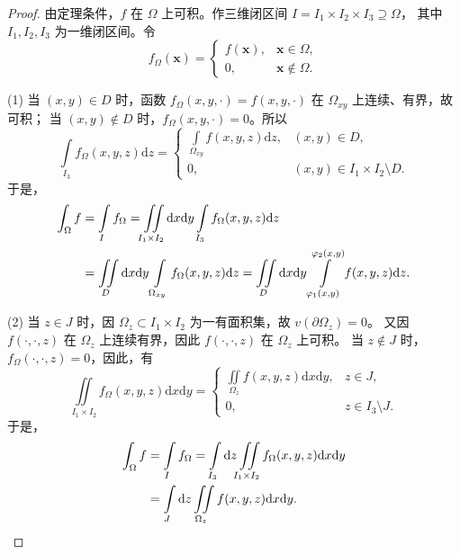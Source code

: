 \begin{proof}
由定理条件，$f$ 在 $\Omega$ 上可积。作三维闭区间 $I = I_1 \times I_2 \times I_3 \supseteq \Omega$，
其中 $I_1, I_2, I_3$ 为一维闭区间。令
\[
f_{\Omega}(\boldsymbol{x}) =
\begin{cases}
  f(\boldsymbol{x}), & \boldsymbol{x} \in \Omega,\\
  0, & \boldsymbol{x} \notin \Omega.
\end{cases}
\]

(1) 当 $(x, y) \in D$ 时，函数 $f_{\Omega}(x, y, \cdot) = f(x, y, \cdot)$ 在 $\Omega_{xy}$ 上连续、有界，故可积；
当 $(x, y) \notin D$ 时，$f_{\Omega}(x, y, \cdot) = 0$。所以
\[
\int \limits_{I_3} f_{\Omega}(x, y, z) \mathrm{d}z =
\begin{cases}
  \displaystyle\int \limits_{\Omega_{xy}} f(x, y, z) \mathrm{d}z, & (x, y) \in D,\\[6pt]
  0, & (x, y) \in I_1 \times I_2 \setminus D.
\end{cases}
\]
于是，
\begin{align*}
\int_{\Omega} f
&= \int \limits_{I} f_{\Omega}
 = \iint \limits_{I_1 \times I_2} \mathrm{d}x \mathrm{d}y \int \limits_{I_3} f_{\Omega}(x, y, z) \mathrm{d}z \notag\\
&= \iint \limits_{D} \mathrm{d}x \mathrm{d}y \int \limits_{\Omega_{xy}} f_{\Omega}(x, y, z) \mathrm{d}z
 = \iint \limits_{D} \mathrm{d}x \mathrm{d}y \int \limits_{\varphi_1(x, y)}^{\varphi_2(x, y)} f(x, y, z) \mathrm{d}z. \notag
\end{align*}

(2) 当 $z \in J$ 时，因 $\Omega_z \subset I_1 \times I_2$ 为一有面积集，故 $v(\partial\Omega_z) = 0$。
又因 $f(\cdot, \cdot, z)$ 在 $\Omega_z$ 上连续有界，因此 $f(\cdot, \cdot, z)$ 在 $\Omega_z$ 上可积。
当 $z \notin J$ 时，$f_{\Omega}(\cdot, \cdot, z) = 0$，因此，有
\[
\iint \limits_{I_1 \times I_2} f_{\Omega}(x, y, z) \mathrm{d}x \mathrm{d}y =
\begin{cases}
  \displaystyle\iint \limits_{\Omega_z} f(x, y, z) \mathrm{d}x \mathrm{d}y, & z \in J,\\[6pt]
  0, & z \in I_3 \setminus J.
\end{cases}
\]
于是，
\begin{align*}
\int_{\Omega} f
&= \int \limits_{I} f_{\Omega}
 = \int \limits_{I_3} \mathrm{d}z \iint \limits_{I_1 \times I_2} f_{\Omega}(x, y, z) \mathrm{d}x \mathrm{d}y \notag\\
&= \int \limits_{J} \mathrm{d}z \iint \limits_{\Omega_z} f(x, y, z) \mathrm{d}x \mathrm{d}y. \notag
\end{align*}
\end{proof}

